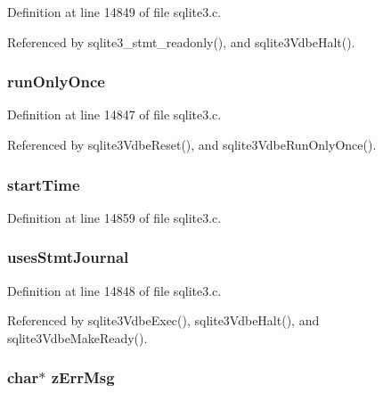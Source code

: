 Definition at line 14849 of file sqlite3.\+c.



Referenced by sqlite3\+\_\+stmt\+\_\+readonly(), and sqlite3\+Vdbe\+Halt().

\hypertarget{struct_vdbe_a7d62ea3d8471f23e077b4bc7b8c624d7}{}
\subsubsection[{run\+Only\+Once}]{ run\+Only\+Once}\label{struct_vdbe_a7d62ea3d8471f23e077b4bc7b8c624d7}


Definition at line 14847 of file sqlite3.\+c.



Referenced by sqlite3\+Vdbe\+Reset(), and sqlite3\+Vdbe\+Run\+Only\+Once().

\hypertarget{struct_vdbe_ac1227987c154acddc3d7b08760dffbf2}{}
\subsubsection[{start\+Time}]{ start\+Time}\label{struct_vdbe_ac1227987c154acddc3d7b08760dffbf2}


Definition at line 14859 of file sqlite3.\+c.

\hypertarget{struct_vdbe_ad44e010197df2be247a419560d5dcd85}{}
\subsubsection[{uses\+Stmt\+Journal}]{ uses\+Stmt\+Journal}\label{struct_vdbe_ad44e010197df2be247a419560d5dcd85}


Definition at line 14848 of file sqlite3.\+c.



Referenced by sqlite3\+Vdbe\+Exec(), sqlite3\+Vdbe\+Halt(), and sqlite3\+Vdbe\+Make\+Ready().

\hypertarget{struct_vdbe_a6fcf95fd4e53f09793171bd5b704ac9a}{}
\subsubsection[{z\+Err\+Msg}]{\setlength{\rightskip}{0pt plus 5cm}char$\ast$ z\+Err\+Msg}\label{struct_vdbe_a6fcf95fd4e53f09793171bd5b704ac9a}


